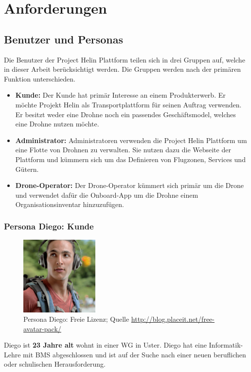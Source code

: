 \chapter{Anforderungen}
\section{Benutzer und Personas}
Die Benutzer der Project Helin Plattform teilen sich in drei Gruppen auf, welche in dieser Arbeit berücksichtigt werden. Die Gruppen werden nach der primären Funktion unterschieden.
\begin{itemize}
	\item{\textbf{Kunde:} Der Kunde hat primär Interesse an einem Produkterwerb. Er möchte Projekt Helin als Transportplattform für seinen Auftrag verwenden. Er besitzt weder eine Drohne noch ein passendes Geschäftsmodel, welches eine Drohne nutzen möchte.}
	\item{\textbf{Administrator:} Administratoren verwenden die Project Helin Plattform um eine Flotte von Drohnen zu verwalten. Sie nutzen dazu die Webseite der Plattform und kümmern sich um das Definieren von Flugzonen, Services und Gütern.}
	\item{\textbf{Drone-Operator:} Der Drone-Operator kümmert sich primär um die Drone und verwendet dafür die Onboard-App um die Drohne einem Organisationsinventar hinzuzufügen.}
\end{itemize}
\subsection{Persona Diego: Kunde}
\begin{figure}[h]
\centering
\includegraphics[width=0.35\textwidth]{images/persona-diego.jpg}
\caption{Persona Diego: Freie Lizenz; Quelle 
\protect\url{http://blog.placeit.net/free-avatar-pack/}}
\label{fig:diego}
\end{figure}
Diego ist \textbf{23 Jahre alt} wohnt in einer WG in Uster.
Diego hat eine Informatik-Lehre mit BMS abgeschlossen und ist auf der Suche nach einer neuen beruflichen oder schulischen Herausforderung.
